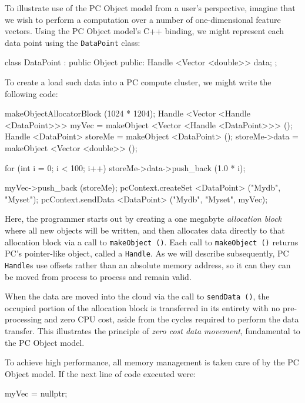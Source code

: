 To illustrate use of the PC Object model from a user's perspective,
imagine that we wish to perform a computation over a number of one-dimensional feature vectors.  
Using the PC Object model's C++ binding, we might represent each data point using the 
\texttt{DataPoint} class:

\begin{code}
class DataPoint : public Object {
public:
	Handle <Vector <double>> data;
};
\end{code}

\noindent
To create a load such data into a PC compute cluster, we might write the following code:

\begin{code}
makeObjectAllocatorBlock (1024 * 1204);
Handle <Vector <Handle <DataPoint>>> myVec = 
     makeObject <Vector <Handle <DataPoint>>> ();
Handle <DataPoint> storeMe = makeObject <DataPoint> ();
storeMe->data = makeObject <Vector <double>> ();

for (int i = 0; i < 100; i++) 
     storeMe->data->push_back (1.0 * i);

myVec->push_back (storeMe);
pcContext.createSet <DataPoint> ("Mydb", "Myset");
pcContext.sendData <DataPoint> ("Mydb", "Myset", myVec);
\end{code}

\noindent
Here, the programmer starts out by creating a one megabyte \emph{allocation block} where all new objects will be written,
and then allocates data directly to that allocation block via a call to \texttt{makeObject ()}.  Each call to  \texttt{makeObject ()}
returns PC's pointer-like object, called a \texttt{Handle}.  As we will describe subsequently, PC \texttt{Handle}s use offsets rather than an absolute memory
address, so it can they can be moved from process to process and remain valid.  

When the data are moved into the cloud via the call to \texttt{sendData ()},
the occupied
portion of the allocation block is transferred in its entirety with
no pre-processing and zero CPU cost, aside from the cycles required to perform the data transfer.  
This illustrates the principle of \emph{zero cost data movement}, fundamental to the PC Object model.

To achieve high performance, all memory management is taken care of by the PC Object model.
If the next line of code executed were:

\begin{code}
myVec = nullptr;
\end{code}

